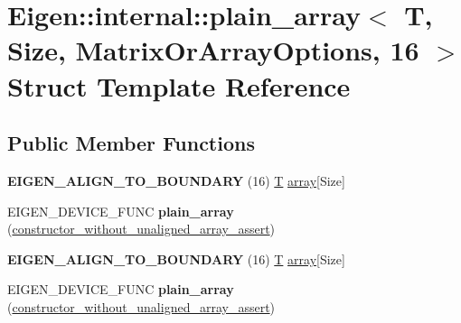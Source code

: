 \hypertarget{struct_eigen_1_1internal_1_1plain__array_3_01_t_00_01_size_00_01_matrix_or_array_options_00_0116_01_4}{}\section{Eigen\+:\+:internal\+:\+:plain\+\_\+array$<$ T, Size, Matrix\+Or\+Array\+Options, 16 $>$ Struct Template Reference}
\label{struct_eigen_1_1internal_1_1plain__array_3_01_t_00_01_size_00_01_matrix_or_array_options_00_0116_01_4}
\subsection*{Public Member Functions}
\begin{DoxyCompactItemize}
\item 
\mbox{\label{struct_eigen_1_1internal_1_1plain__array_3_01_t_00_01_size_00_01_matrix_or_array_options_00_0116_01_4_a0f68e88b4e3283699dfc1cc585ec13e7}} 
{\bfseries E\+I\+G\+E\+N\+\_\+\+A\+L\+I\+G\+N\+\_\+\+T\+O\+\_\+\+B\+O\+U\+N\+D\+A\+RY} (16) \hyperlink{group___sparse_core___module}{T} \hyperlink{class_eigen_1_1array}{array}\mbox{[}Size\mbox{]}
\item 
\mbox{\label{struct_eigen_1_1internal_1_1plain__array_3_01_t_00_01_size_00_01_matrix_or_array_options_00_0116_01_4_adf7f104142768440f9c7f410e5859ae0}} 
E\+I\+G\+E\+N\+\_\+\+D\+E\+V\+I\+C\+E\+\_\+\+F\+U\+NC {\bfseries plain\+\_\+array} (\hyperlink{struct_eigen_1_1internal_1_1constructor__without__unaligned__array__assert}{constructor\+\_\+without\+\_\+unaligned\+\_\+array\+\_\+assert})
\item 
\mbox{\label{struct_eigen_1_1internal_1_1plain__array_3_01_t_00_01_size_00_01_matrix_or_array_options_00_0116_01_4_a0f68e88b4e3283699dfc1cc585ec13e7}} 
{\bfseries E\+I\+G\+E\+N\+\_\+\+A\+L\+I\+G\+N\+\_\+\+T\+O\+\_\+\+B\+O\+U\+N\+D\+A\+RY} (16) \hyperlink{group___sparse_core___module}{T} \hyperlink{class_eigen_1_1array}{array}\mbox{[}Size\mbox{]}
\item 
\mbox{\label{struct_eigen_1_1internal_1_1plain__array_3_01_t_00_01_size_00_01_matrix_or_array_options_00_0116_01_4_adf7f104142768440f9c7f410e5859ae0}} 
E\+I\+G\+E\+N\+\_\+\+D\+E\+V\+I\+C\+E\+\_\+\+F\+U\+NC {\bfseries plain\+\_\+array} (\hyperlink{struct_eigen_1_1internal_1_1constructor__without__unaligned__array__assert}{constructor\+\_\+without\+\_\+unaligned\+\_\+array\+\_\+assert})
\end{DoxyCompactItemize}


